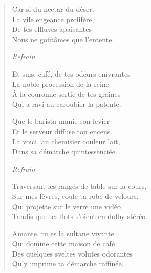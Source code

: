 \begin{verse}
  Car si du nectar du désert\\ 
  La vile engeance prolifère,\\ 
  De tes effluves apaisantes\\ 
  Nous ne goûtâmes que l’entente.  %

  \emph{Refrain}  %

  Et suis, café, de tes odeurs enivrantes\\ 
  La noble procession de la reine\\ 
  À la couronne sertie de tes graines\\ 
  Qui a ravi au caroubier la patente.  %

  Que le barista manie son levier\\ 
  Et le serveur diffuse ton encens.\\  %
  La voici, au chemisier couleur lait,\\ 
  Dans sa démarche quintessenciée.   

  \emph{Refrain}  %

  Traversant les rangés de table sur la cours,\\ 
  Sur mes lèvres, coule ta robe de velours.\\ 
  Qui projette sur le verre une vidéo\\ 
  Tandis que tes flots s’oient en dolby stéréo.  

  Amante, tu es la sultane vivante\\ 
  Qui domine cette maison de café\\ 
  Des quelques sveltes volutes odorantes\\ 
  Qu’y imprime ta démarche raffinée. 


\end{verse}
